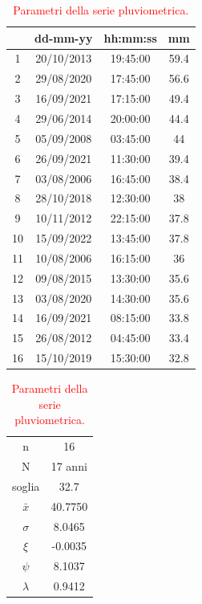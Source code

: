 \begin{table}[H]
    \caption*{Evento pluviometrico di 60 minuti.}
    \begin{minipage}{.5\linewidth}
      \caption{\textcolor{red}{Campione della serie pluviometrica.}}
      \centering
        \begin{tabular}{cccc}
            \toprule
            & dd-mm-yy   & hh:mm:ss & mm \\
         \midrule
         1  & 20/10/2013 & 19:45:00 & 59.4 \\
         2  & 29/08/2020 & 17:45:00 & 56.6 \\
         3  & 16/09/2021 & 17:15:00 & 49.4 \\
         4  & 29/06/2014 & 20:00:00 & 44.4 \\
         5  & 05/09/2008 & 03:45:00 & 44   \\
         6  & 26/09/2021 & 11:30:00 & 39.4 \\
         7  & 03/08/2006 & 16:45:00 & 38.4 \\
         8  & 28/10/2018 & 12:30:00 & 38   \\
         9  & 10/11/2012 & 22:15:00 & 37.8 \\
         10 & 15/09/2022 & 13:45:00 & 37.8 \\
         11 & 10/08/2006 & 16:15:00 & 36   \\
         12 & 09/08/2015 & 13:30:00 & 35.6 \\
         13 & 03/08/2020 & 14:30:00 & 35.6 \\
         14 & 16/09/2021 & 08:15:00 & 33.8 \\
         15 & 26/08/2012 & 04:45:00 & 33.4 \\
         16 & 15/10/2019 & 15:30:00 & 32.8 \\
         \bottomrule
        \end{tabular}
    \end{minipage}%
    \begin{minipage}{.5\linewidth}
      \centering
        \caption{\textcolor{red}{Parametri della serie pluviometrica.}}
        \begin{tabular}{cc}
            \toprule
            n        &    16     \\
            N        & 17 anni \\
            soglia   &      32.7   \\
            $\bar{x}$ &    40.7750    \\
            $\sigma$ &     8.0465    \\
            $\xi$      &   -0.0035    \\
            $\psi$      &   8.1037  \\
            $\lambda$   &   0.9412 \\
        \bottomrule     
        \end{tabular}
    \end{minipage} 
\end{table}

